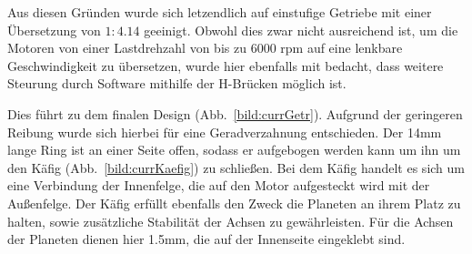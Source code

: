 Aus diesen Gründen wurde sich letzendlich auf einstufige Getriebe mit einer Übersetzung von $1:4.14$ geeinigt.
Obwohl dies zwar nicht ausreichend ist, um die Motoren von einer Lastdrehzahl von bis zu 6000 rpm auf eine lenkbare Geschwindigkeit zu übersetzen,
wurde hier ebenfalls mit bedacht, dass weitere Steurung durch Software mithilfe der H-Brücken möglich ist.

Dies führt zu dem finalen Design (Abb.~\ref{bild:currGetr}). 
Aufgrund der geringeren Reibung wurde sich hierbei für eine Geradverzahnung entschieden.
Der 14mm lange Ring ist an einer Seite offen, sodass er aufgebogen werden kann um ihn um den Käfig (Abb.~\ref{bild:currKaefig}) zu schließen.
Bei dem Käfig handelt es sich um eine Verbindung der Innenfelge, die auf den Motor aufgesteckt wird mit der Außenfelge.
Der Käfig erfüllt ebenfalls den Zweck die Planeten an ihrem Platz zu halten, sowie zusätzliche Stabilität der Achsen zu gewährleisten.
Für die Achsen der Planeten dienen hier 1.5mm, die auf der Innenseite eingeklebt sind.

